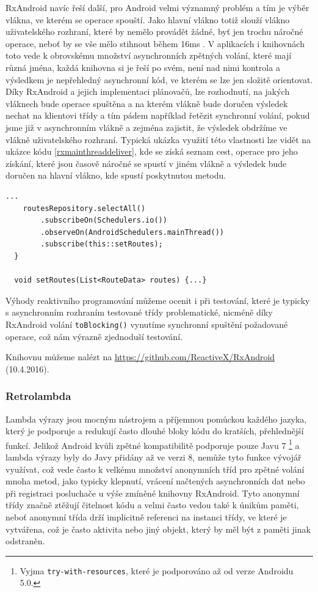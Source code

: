 \documentclass[czech,master,public,dept460,male,java,cpdeclaration]{diploma}
\begin{document}
RxAndroid navíc řeší další, pro Android velmi významný problém a tím je výběr vlákna, ve kterém se
operace spouští. Jako hlavní vlákno totiž slouží vlákno uživatelského rozhraní, které by
nemělo provádět žádné, byť jen trochu náročné operace, neboť by se vše mělo stihnout během 16ms \cite{perf}.
V aplikacích i knihovnách toto vede k obrovskému množství asynchronních zpětných volání, které mají různá jména,
každá knihovna si je řeší po svém, není nad nimi kontrola a výsledkem je nepřehledný asynchronní kód,
ve kterém se lze jen složitě orientovat. Díky RxAndroid a jejich implementaci plánovačů, lze rozhodnutí,
na jakých vláknech bude operace spuštěna a na kterém vlákně bude doručen výsledek nechat na klientovi třídy
a tím pádem například řetězit synchronní volání, pokud jsme již v asynchronním vlákně a zejména zajistit,
že výsledek obdržíme ve vlákně uživatelského rozhraní. Typická ukázka využití této vlastnosti
lze vidět na ukázce kódu \ref{rxmainthreaddeliver}, kde se získá seznam cest, operace pro jeho získání,
které jsou časově náročné se spustí v jiném vlákně a výsledek bude doručen na hlavní vlákno,
kde spustí poskytnutou metodu.


\begin{lstlisting}[label=rxmainthreaddeliver,caption=Reakce na událost v UI vlákně pomocí RxAndorid]
    ...
    routesRepository.selectAll()
        .subscribeOn(Schedulers.io())
        .observeOn(AndroidSchedulers.mainThread())
        .subscribe(this::setRoutes);
  }

  void setRoutes(List<RouteData> routes) {...}
\end{lstlisting}

Výhody reaktivního programování můžeme ocenit i při testování, které je typicky s asynchronním
rozhraním testované třídy problematické, nicméně díky RxAndroid volání \texttt{toBlocking()} vynutíme
synchronní spuštění požadované operace, což nám výrazně zjednoduší testování.

Knihovnu můžeme nalézt na \url{https://github.com/ReactiveX/RxAndroid}  (10.4.2016).

\subsubsection{Retrolambda}
Lambda výrazy jsou mocným nástrojem a příjemnou pomůckou každého jazyka, který je podporuje a redukují
často dlouhé bloky kódu do kratších, přehlednější funkcí. Jelikož Android kvůli zpětné
kompatibilitě podporuje pouze Javu 7
\footnote{Vyjma \texttt{try-with-resources}, které je podporováno až od verze Androidu 5.0.}
a lambda výrazy byly do Javy přidány až ve verzi 8, nemůže tyto funkce vývojář využívat,
což vede často k velkému množství anonymních tříd pro zpětné volání mnoha metod, jako typicky klepnutí,
vrácení načtených asynchronních dat nebo při registraci posluchače u výše zmíněné knihovny RxAndroid.
Tyto anonymní třídy značně ztěžují čitelnost kódu a velmi často vedou také k únikům paměti,
neboť anonymní třída drží implicitně referenci na instanci třídy, ve které je vytvářena, což je často
aktivita nebo jiný objekt, který by měl být z paměti jinak odstraněn.
\end{document}
